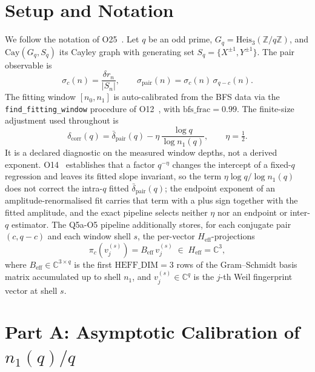 \documentclass[11pt,a4paper]{article}
\theoremstyle{definition}
\begin{document}
  \section{Setup and Notation}

  We follow the notation of O25~\cite{Beau2026a29}.
  Let $q$ be an odd prime, $G_q = \mathrm{Heis}_3(\mathbb{Z}/q\mathbb{Z})$, and
  $\mathrm{Cay}(G_q, S_q)$ its Cayley graph with generating set $S_q = \{X^{\pm 1}, Y^{\pm 1}\}$.
  The pair observable is
  \[
    \sigma_c(n) = \frac{\delta r_n}{|S_n|}, \qquad
    \sigma_{\mathrm{pair}}(n) = \sigma_c(n)\,\sigma_{q-c}(n).
  \]
  The fitting window $[n_0, n_1]$ is auto-calibrated from the BFS data via the
  \texttt{find\_fitting\_window} procedure of O12~\cite{Beau2026a16}, with
  $\mathrm{bfs\_frac} = 0.99$.
  The finite-size adjustment used throughout is
  \begin{equation}
    \delta_{\mathrm{corr}}(q) = \bar{\delta}_{\mathrm{pair}}(q) - \eta\,
    \frac{\log q}{\log n_1(q)}, \qquad \eta = \tfrac{1}{2}.
    \label{eq:dcorr}
  \end{equation}
  It is a declared diagnostic on the measured window depths, not a derived exponent.
  O14~\cite{Beau2026a18} establishes that a factor $q^{-\eta}$ changes the intercept of a
  fixed-$q$ regression and leaves its fitted slope invariant, so the term $\eta\log q/\log n_1(q)$
  does not correct the intra-$q$ fitted $\bar{\delta}_{\mathrm{pair}}(q)$; the endpoint exponent of
  an amplitude-renormalised fit carries that term with a plus sign together with the fitted
  amplitude, and the exact pipeline selects neither $\eta$ nor an endpoint or inter-$q$ estimator.
  The Q5a-O5 pipeline additionally stores, for each conjugate pair $(c, q-c)$ and each
  window shell $s$, the per-vector $H_{\mathrm{eff}}$-projections
  \begin{equation}
    \pi_c\!\left(v^{(s)}_j\right) = B_{\mathrm{eff}}\, v^{(s)}_j \;\in\; H_{\mathrm{eff}}
    = \mathbb{C}^3,
    \label{eq:pimap}
  \end{equation}
  where $B_{\mathrm{eff}} \in \mathbb{C}^{3 \times q}$ is the first $\mathrm{HEFF\_DIM} = 3$
  rows of the Gram--Schmidt basis matrix accumulated up to shell $n_1$, and
  $v^{(s)}_j \in \mathbb{C}^q$ is the $j$-th Weil fingerprint vector at shell $s$.

  \section{Part A: Asymptotic Calibration of \texorpdfstring{$n_1(q)/q$}{n1(q)/q}}
\end{document}
